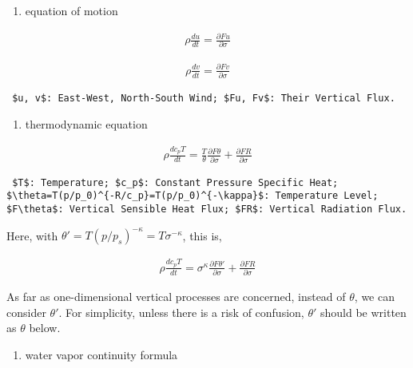 \begin{enumerate}
\def\labelenumi{\arabic{enumi}.}
\tightlist
\item
  equation of motion
\end{enumerate}

\begin{eqnarray}
  \rho \frac{d {u}}{d {t}} = \frac{\partial{Fu}}{\partial {\sigma}}
\end{eqnarray}

\begin{eqnarray}
  \rho \frac{d {v}}{d {t}} = \frac{\partial{Fv}}{\partial {\sigma}}
\end{eqnarray}

\begin{verbatim}
 $u, v$: East-West, North-South Wind; $Fu, Fv$: Their Vertical Flux.
\end{verbatim}

\begin{enumerate}
\def\labelenumi{\arabic{enumi}.}
\setcounter{enumi}{1}
\tightlist
\item
  thermodynamic equation
\end{enumerate}

\begin{eqnarray}
  \rho \frac{d {c_p T}}{d {t}} = \frac{T}{\theta} \frac{\partial{F{\theta}}}{\partial {\sigma}}
                     + \frac{\partial{F{R}}}{\partial {\sigma}}
\end{eqnarray}

\begin{verbatim}
 $T$: Temperature; $c_p$: Constant Pressure Specific Heat; $\theta=T(p/p_0)^{-R/c_p}=T(p/p_0)^{-\kappa}$: Temperature Level; $F\theta$: Vertical Sensible Heat Flux; $FR$: Vertical Radiation Flux.
\end{verbatim}

Here, with \(\theta'=T(p/p_s)^{-\kappa}=T\sigma^{-\kappa}\), this is,

\begin{eqnarray}
  \rho \frac{d {c_p T}}{d {t}} = \sigma^\kappa \frac{\partial{F{\theta'}}}{\partial {\sigma}}
                     + \frac{\partial{F{R}}}{\partial {\sigma}}
\end{eqnarray}

As far as one-dimensional vertical processes are concerned, instead of
\(\theta\), we can consider \(\theta'\). For simplicity, unless there is
a risk of confusion, \(\theta'\) should be written as \(\theta\) below.

\begin{enumerate}
\def\labelenumi{\arabic{enumi}.}
\setcounter{enumi}{2}
\tightlist
\item
  water vapor continuity formula
\end{enumerate}

